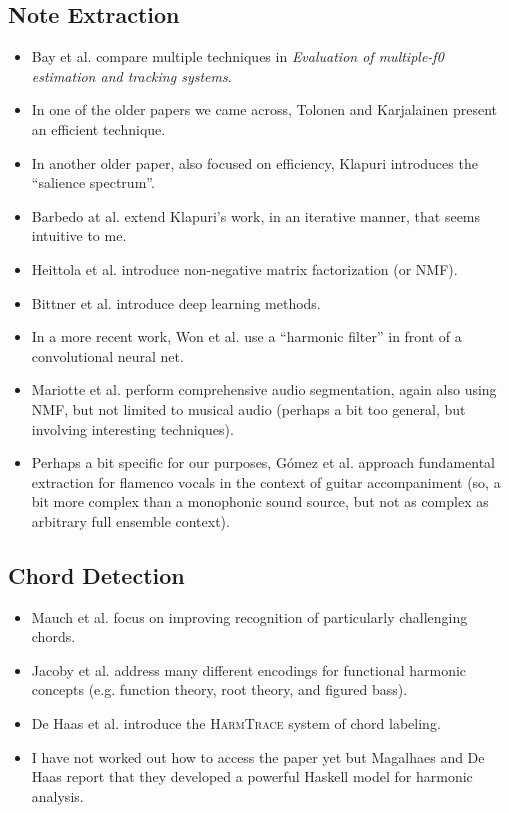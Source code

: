\subsection{Note Extraction}
\begin{itemize}
	\item Bay et al. \cite{bay2009evaluation} compare multiple techniques in \textit{Evaluation of multiple-f0 estimation and tracking systems}.
	\item In one of the older papers we came across, Tolonen and Karjalainen \cite{tolonen2000computationally} present an efficient technique.
	\item In another older paper, also focused on efficiency, Klapuri \cite{klapuri2006multiple} introduces the ``salience spectrum''.
	\item Barbedo at al. \cite{barbedo2007high} extend Klapuri's work, in an iterative manner, that seems intuitive to me.
	\item Heittola et al. \cite{heittola2009musical} introduce non-negative matrix factorization (or NMF).
	\item Bittner et al. \cite{bittner2017deep} introduce deep learning methods.
	\item In a more recent work, Won et al. \cite{won2020data} use a ``harmonic filter'' in front of a convolutional neural net.
	\item Mariotte et al. \cite{mariotte2024explainable} perform comprehensive audio segmentation, again also using NMF, but not limited to musical audio (perhaps a bit too general, but involving interesting techniques).
	\item Perhaps a bit specific for our purposes, Gómez et al. \cite{gomez2012predominant} approach fundamental extraction for flamenco vocals in the context of guitar accompaniment (so, a bit more complex than a monophonic sound source, but not as complex as arbitrary full ensemble context).
\end{itemize}

\newpage
\subsection{Chord Detection}
\begin{itemize}
	\item Mauch et al. \cite{mauch2010approximate} focus on improving recognition of particularly challenging chords.
	\item Jacoby et al. \cite{jacoby2015information} address many different encodings for functional harmonic concepts (e.g. function theory, root theory, and figured bass).
	\item De Haas et al. \cite{de2011harmtrace} introduce the \textsc{HarmTrace} system of chord labeling.
	\item I have not worked out how to access the paper yet but Magalhaes and De Haas \cite{magalhaes2011functional} report that they developed a powerful Haskell model for harmonic analysis.
\end{itemize}
